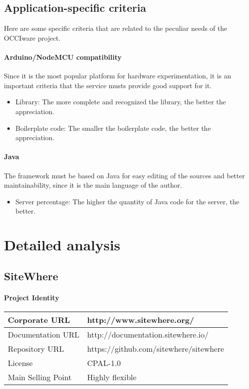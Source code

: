 \documentclass{article}
\begin{document}
\subsection{Application-specific criteria}

Here are some specific criteria that are related to the peculiar needs of the OCCIware project.

\paragraph{Arduino/NodeMCU compatibility} Since it is the most popular platform for hardware experimentation, it is an important criteria that the service musts provide good support for it.

\begin{itemize}
\item Library: The more complete and recognized the library, the better the appreciation.
\item Boilerplate code: The smaller the boilerplate code, the better the appreciation.
\end{itemize}

\paragraph{Java} The framework must be based on Java for easy editing of the sources and better maintainability, since it is the main language of the author.

\begin{itemize}
\item Server percentage: The higher the quantity of Java code for the server, the better.
\end{itemize}

\newpage

\section{Detailed analysis}

\subsection{SiteWhere}

\paragraph{Project Identity}

\begin{center}
\begin{tabular}{|l|l|}
\hline
Corporate URL & http://www.sitewhere.org/ \\ \hline
Documentation URL & http://documentation.sitewhere.io/ \\ \hline
Repository URL & https://github.com/sitewhere/sitewhere \\ \hline
License & CPAL-1.0 \\ \hline
Main Selling Point & Highly flexible \\ \hline
\end{tabular}
\end{center}
\end{document}
